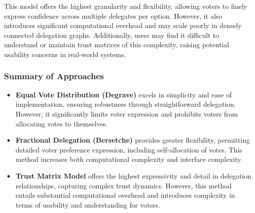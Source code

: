 


This model offers the highest granularity and flexibility, allowing voters to finely express confidence across multiple delegates per option. However, it also introduces significant computational overhead and may scale poorly in densely connected delegation graphs. Additionally, users may find it difficult to understand or maintain trust matrices of this complexity, raising potential usability concerns in real-world systems.

\subsubsection*{Summary of Approaches}

\begin{itemize}
  \item \textbf{Equal Vote Distribution (Degrave)} excels in simplicity and ease of implementation, ensuring robustness through straightforward delegation. However, it significantly limits voter expression and prohibits voters from allocating votes to themselves.
  \item \textbf{Fractional Delegation (Bersetche)} provides greater flexibility, permitting detailed voter preference expression, including self-allocation of votes. This method increases both computational complexity and interface complexity.
  \item \textbf{Trust Matrix Model} offers the highest expressivity and detail in delegation relationships, capturing complex trust dynamics. However, this method entails substantial computational overhead and introduces complexity in terms of usability and understanding for voters.
\end{itemize}

